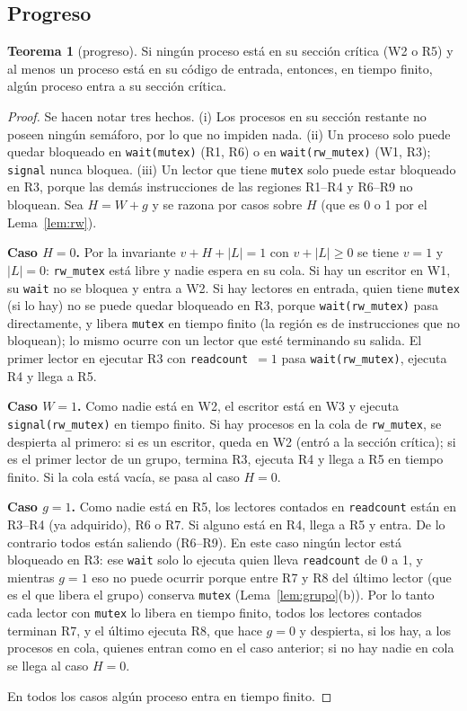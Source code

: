 \documentclass[12pt,letterpaper]{article}
\theoremstyle{definition}
\newtheorem{teorema}{Teorema}
\newcommand{\sem}[1]{\texttt{#1}}
\begin{document}
\subsection{Progreso}
\begin{teorema}[progreso]\label{teo:prog}
Si ningún proceso está en su sección crítica (W2 o R5) y al menos un proceso está en su código de entrada, entonces, en tiempo finito, algún proceso entra a su sección crítica.
\end{teorema}
\begin{proof}
Se hacen notar tres hechos. (i) Los procesos en su sección restante no poseen ningún semáforo, por lo que no impiden nada. (ii) Un proceso solo puede quedar bloqueado en \sem{wait(mutex)} (R1, R6) o en \sem{wait(rw\_mutex)} (W1, R3); \sem{signal} nunca bloquea. (iii) Un lector que tiene \sem{mutex} solo puede estar bloqueado en R3, porque las demás instrucciones de las regiones R1--R4 y R6--R9 no bloquean. Sea $H = W + g$ y se razona por casos sobre $H$ (que es 0 o 1 por el Lema~\ref{lem:rw}).

\textbf{Caso $H=0$.} Por la invariante $v+H+|L|=1$ con $v+|L|\ge0$ se tiene $v=1$ y $|L|=0$: \sem{rw\_mutex} está libre y nadie espera en su cola. Si hay un escritor en W1, su \sem{wait} no se bloquea y entra a W2. Si hay lectores en entrada, quien tiene \sem{mutex} (si lo hay) no se puede quedar bloqueado en R3, porque \sem{wait(rw\_mutex)} pasa directamente, y libera \sem{mutex} en tiempo finito (la región es de instrucciones que no bloquean); lo mismo ocurre con un lector que esté terminando su salida. El primer lector en ejecutar R3 con \sem{readcount}~$=1$ pasa \sem{wait(rw\_mutex)}, ejecuta R4 y llega a R5.

\textbf{Caso $W=1$.} Como nadie está en W2, el escritor está en W3 y ejecuta \sem{signal(rw\_mutex)} en tiempo finito. Si hay procesos en la cola de \sem{rw\_mutex}, se despierta al primero: si es un escritor, queda en W2 (entró a la sección crítica); si es el primer lector de un grupo, termina R3, ejecuta R4 y llega a R5 en tiempo finito. Si la cola está vacía, se pasa al caso $H=0$.

\textbf{Caso $g=1$.} Como nadie está en R5, los lectores contados en \sem{readcount} están en R3--R4 (ya adquirido), R6 o R7. Si alguno está en R4, llega a R5 y entra. De lo contrario todos están saliendo (R6--R9). En este caso ningún lector está bloqueado en R3: ese \sem{wait} solo lo ejecuta quien lleva \sem{readcount} de 0 a 1, y mientras $g=1$ eso no puede ocurrir porque entre R7 y R8 del último lector (que es el que libera el grupo) conserva \sem{mutex} (Lema~\ref{lem:grupo}(b)). Por lo tanto cada lector con \sem{mutex} lo libera en tiempo finito, todos los lectores contados terminan R7, y el último ejecuta R8, que hace $g=0$ y despierta, si los hay, a los procesos en cola, quienes entran como en el caso anterior; si no hay nadie en cola se llega al caso $H=0$.

En todos los casos algún proceso entra en tiempo finito. \qedhere
\end{proof}
\end{document}
